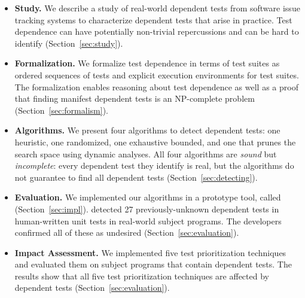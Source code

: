 \begin{itemize}

  \item \textbf{Study.} We describe a study of \dtnum real-world
  dependent tests from \repnum software issue tracking
  systems to characterize dependent tests that
  arise in practice.  Test dependence can have
  potentially non-trivial repercussions and can be hard to identify
  (Section~\ref{sec:study}).

\item \textbf{Formalization.} We formalize test dependence
  in terms of test suites as ordered sequences of tests and explicit execution
  environments for test suites.  The formalization enables reasoning about test dependence
  as well as a proof that finding manifest dependent tests is an NP-complete
  problem (Section~\ref{sec:formalism}).

  \item \textbf{Algorithms.} We present four algorithms
  to detect dependent tests: one heuristic,
  one randomized, one exhaustive bounded, and one that prunes the search
  space using dynamic analyses.
  All four algorithms are \emph{sound} but \emph{incomplete}:
  every dependent test they identify is real, but the algorithms
  do not guarantee to find all dependent tests (Section~\ref{sec:detecting}). 

  \item \textbf{Evaluation.} We implemented our algorithms in a prototype
  tool, called \ourtool (Section~\ref{sec:impl}).
  \ourtool detected 27 previously-unknown dependent tests in human-written
  unit tests in \subjnum real-world subject programs.
  The developers confirmed all of these as
  undesired (Section~\ref{sec:evaluation}).

  \item \textbf{Impact Assessment.} We implemented five test prioritization
  techniques and evaluated them on \subjnum subject programs
  that contain dependent tests. The results show that all
  five test prioritization techniques are affected by dependent tests
  (Section~\ref{sec:evaluation}).

\end{itemize}
\vspace{-4mm}
